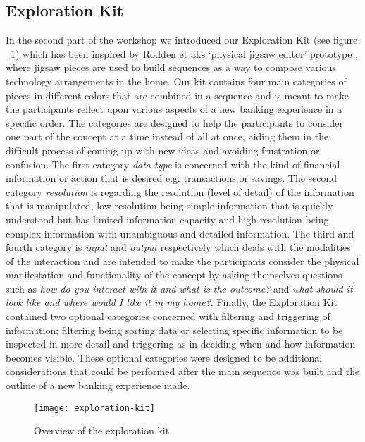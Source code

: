 \subsection{Exploration Kit}
In the second part of the workshop we introduced our Exploration Kit (see figure ~\ref{fig:exploration-kit}) which has been inspired by Rodden et al.s ‘physical jigsaw editor’ prototype \cite{rodden2004between}, where jigsaw pieces are used to build sequences as a way to compose various technology arrangements in the home. Our kit contains four main categories of pieces in different colors that are combined in a sequence and is meant to make the participants reflect upon various aspects of a new banking experience in a specific order. The categories are designed to help the participants to consider one part of the concept at a time instead of all at once, aiding them in the difficult process of coming up with new ideas and avoiding frustration or confusion. The first category \emph{data type} is concerned with the kind of financial information or action that is desired e.g. transactions or savings. The second category \emph{resolution} is regarding the resolution (level of detail) of the information that is manipulated; low resolution being simple information that is quickly understood but has limited information capacity and high resolution being complex information with unambiguous and detailed information. The third and fourth category is \emph{input} and \emph{output} respectively which deals with the modalities of the interaction and are intended to make the participants consider the physical manifestation and functionality of the concept by asking themselves questions such as \emph{how do you interact with it and what is the outcome?} and \emph{what should it look like and where would I like it in my home?}. Finally, the Exploration Kit contained two optional categories concerned with filtering and triggering of information; filtering being sorting data or selecting specific information to be inspected in more detail and triggering as in deciding when and how information becomes visible. These optional categories were designed to be additional considerations that could be performed after the main sequence was built and the outline of a new banking experience made.

\begin{figure}[!h]
	\centering
	\texttt{[image: exploration-kit]}
	\caption{Overview of the exploration kit}
	\label{fig:exploration-kit}
\end{figure}
